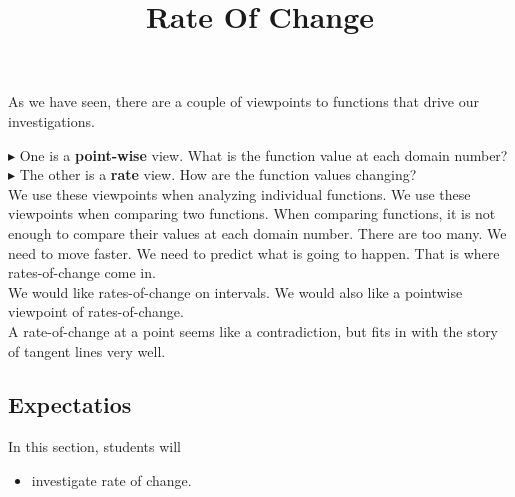 \documentclass{ximera}
\title{Rate Of Change}
\begin{document}
\begin{abstract}
\end{abstract}
\maketitle







As we have seen, there are a couple of viewpoints to functions that drive our investigations.

$\blacktriangleright$ One is a \textbf{point-wise} view.  What is the function value at each domain number? \\


$\blacktriangleright$ The other is a \textbf{rate} view.  How are the function values changing? \\



We use these viewpoints when analyzing individual functions.  We use these viewpoints when comparing two functions. When comparing functions, it is not enough to compare their values at each domain number.  There are too many.  We need to move faster.  We need to predict what is going to happen. That is where rates-of-change come in. \\




We would like rates-of-change on intervals.  We would also like a pointwise viewpoint of rates-of-change. \\



A rate-of-change at a point seems like a contradiction, but fits in with the story of tangent lines very well.













\subsection{Expectatios}


\begin{sectionOutcomes}
In this section, students will 

\begin{itemize}
\item investigate rate of change.

\end{itemize}
\end{sectionOutcomes}
\end{document}
